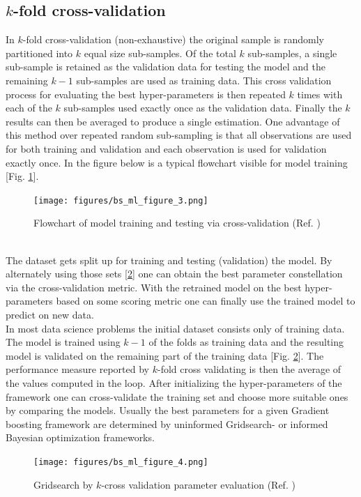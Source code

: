 \documentclass[12pt, a4paper]{article}
\begin{document}
\subsection{$k$-fold cross-validation}
In $k$-fold cross-validation (non-exhaustive) the original sample is randomly partitioned into $k$ equal size sub-samples.
Of the total $k$ sub-samples, a single sub-sample is retained as the validation data for testing the model and the remaining $k - 1$ sub-samples are used as training data. This cross validation process for evaluating the best hyper-parameters is then repeated $k$ times with each of the $k$ sub-samples used exactly once as the validation data. Finally the $k$ results can then be averaged to produce a single estimation. One advantage of this method over repeated random sub-sampling is that all observations are used for both training and validation and each observation is used for validation exactly once. In the figure below is a typical flowchart visible for model training [Fig. \ref{fig: cv_flowchart}].
\begin{figure}[!htpb]
    \centering
    \texttt{[image: figures/bs\_ml\_figure\_3.png]}
    \caption[Flowchart of model training]{Flowchart of model training and testing via cross-validation (Ref. \cite{Scikit2023})}
    \label{fig: cv_flowchart}
\end{figure}
\\
The dataset gets split up for training and testing (validation) the model. By alternately using those sets [\ref{fig: cv_split}] one can obtain the best parameter constellation via the cross-validation metric. With the retrained model on the best hyper-parameters based on some scoring metric one can finally use the trained model to predict on new data. \\
In most data science problems the initial dataset consists only of training data. The model is trained using $k - 1$ of the folds as training data and the resulting model is validated on the remaining part of the training data [Fig. \ref{fig: cv_split}].
The performance measure reported by $k$-fold cross validating is then the average of the values computed in the loop.
After initializing the hyper-parameters of the framework one can cross-validate the training set and choose more suitable ones by comparing the models. Usually the best parameters for a given Gradient boosting framework are determined by uninformed Gridsearch- or informed Bayesian optimization frameworks.
\begin{figure}[!htpb]
    \centering
    \texttt{[image: figures/bs\_ml\_figure\_4.png]}
    \caption[Gridsearch by cross validation parameter evaluation]{Gridsearch by $k$-cross validation parameter evaluation (Ref. \cite{Scikit2023})}
    \label{fig: cv_split}
\end{figure}
\end{document}
